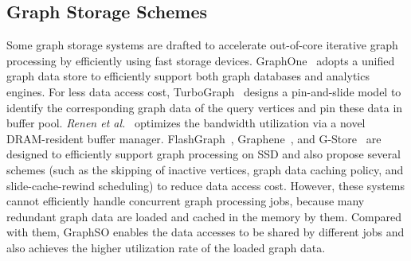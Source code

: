 \documentclass[10pt,journal,compsoc]{IEEEtran}
\begin{document}
\subsection{Graph Storage Schemes}
\vspace{-2pt}
Some graph storage systems are drafted to accelerate out-of-core iterative graph processing by efficiently using fast storage devices.
GraphOne~\cite{GraphOne} adopts a unified graph data store to efficiently support both graph databases and analytics engines.
For less data access cost, TurboGraph~\cite{TurboGraph} designs a pin-and-slide model to identify the corresponding graph data of the query vertices and pin these data in buffer pool. {\em Renen et al.}~\cite{Alexander} optimizes the bandwidth utilization via a novel DRAM-resident buffer manager.
FlashGraph~\cite{FlashGraph}, Graphene~\cite{Graphene}, and G-Store~\cite{G-store} are designed to efficiently support graph processing on SSD and also propose several schemes (such as the skipping of inactive vertices, graph data caching policy, and slide-cache-rewind scheduling) to reduce data access cost.
However, these systems cannot efficiently handle concurrent graph processing jobs, because many redundant graph data are loaded and cached in the memory by them. Compared with them, GraphSO enables the data accesses to be shared by different jobs and also achieves the higher utilization rate of the loaded graph data.



\vspace{-10pt}
\end{document}
